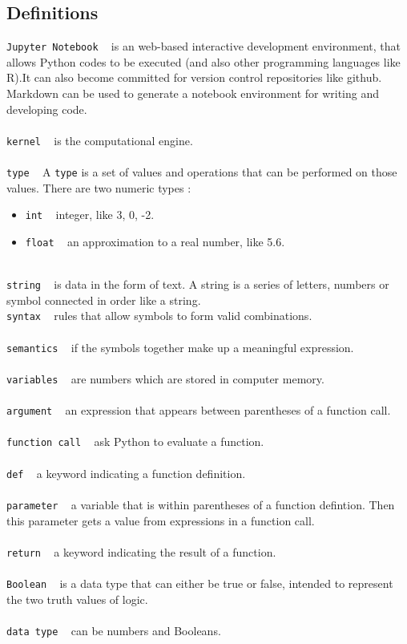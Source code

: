 \documentclass{article}
\begin{document}
\subsection{Definitions}
\texttt{Jupyter Notebook} ~ is an web-based interactive development environment, that allows Python codes to be executed (and also other programming languages like R).It can also become committed for version control repositories like github. Markdown can be used to generate a notebook environment for writing and developing code. \\
\\
\texttt{kernel} ~ is the computational engine. \\ 
\\
\texttt{type} ~ A \texttt{type} is a set of values and operations that can be performed on those values. There are two numeric types : 
\begin{itemize}
\item \texttt{int} ~ integer, like 3, 0, -2.
\item \texttt{float} ~ an approximation to a real number, like 5.6.
\end{itemize}\\
\texttt{string} ~ is data in the form of text. A string is a series of letters, numbers or symbol connected in order like a string.\\
\texttt{syntax} ~ rules that allow symbols to form valid combinations.\\
\\
\texttt{semantics} ~ if the symbols together make up a meaningful expression. \\
\\
\texttt{variables} ~ are numbers which are stored in computer memory. \\
\\
\texttt{argument} ~ an expression that appears between parentheses of a function call.\\
\\
\texttt{function call} ~ ask Python to evaluate a function.\\
\\
\texttt{def} ~ a keyword indicating a function definition.\\
\\
\texttt{parameter} ~ a variable that is within parentheses of a function defintion. Then this parameter gets a value from expressions in a function call.\\
\\
\texttt{return} ~ a keyword indicating the result of a function.\\
\\
\texttt{Boolean} ~ is a data type that can either be true or false, intended to represent the two truth values of logic. \\
\\
\texttt{data type} ~ can be numbers and Booleans.\\
\end{document}
